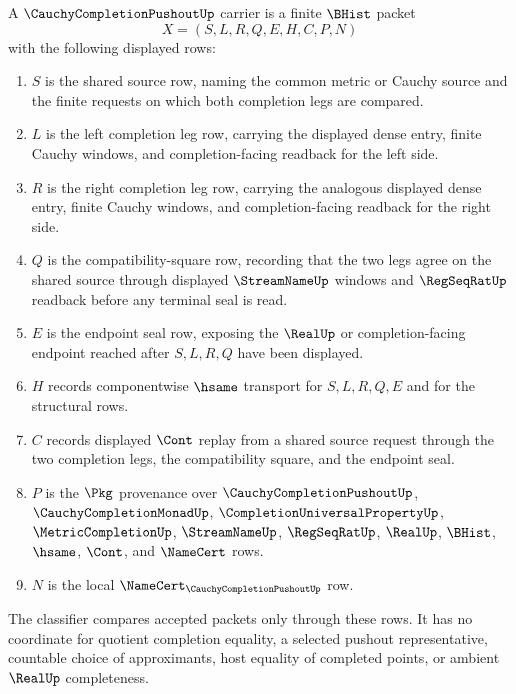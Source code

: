 \begin{definition}
\label{def:cauchy-completion-pushout-carrier}
A $\CauchyCompletionPushoutUp$ carrier is a finite $\BHist$ packet
$$
X=(S,L,R,Q,E,H,C,P,N)
$$
with the following displayed rows:
\begin{enumerate}
\item $S$ is the shared source row, naming the common metric or Cauchy source and the finite requests on which both completion legs are compared.
\item $L$ is the left completion leg row, carrying the displayed dense entry, finite Cauchy windows, and completion-facing readback for the left side.
\item $R$ is the right completion leg row, carrying the analogous displayed dense entry, finite Cauchy windows, and completion-facing readback for the right side.
\item $Q$ is the compatibility-square row, recording that the two legs agree on the shared source through displayed $\StreamNameUp$ windows and $\RegSeqRatUp$ readback before any terminal seal is read.
\item $E$ is the endpoint seal row, exposing the $\RealUp$ or completion-facing endpoint reached after $S,L,R,Q$ have been displayed.
\item $H$ records componentwise $\hsame$ transport for $S,L,R,Q,E$ and for the structural rows.
\item $C$ records displayed $\Cont$ replay from a shared source request through the two completion legs, the compatibility square, and the endpoint seal.
\item $P$ is the $\Pkg$ provenance over $\CauchyCompletionPushoutUp$, $\CauchyCompletionMonadUp$, $\CompletionUniversalPropertyUp$, $\MetricCompletionUp$, $\StreamNameUp$, $\RegSeqRatUp$, $\RealUp$, $\BHist$, $\hsame$, $\Cont$, and $\NameCert$ rows.
\item $N$ is the local $\NameCert_{\CauchyCompletionPushoutUp}$ row.
\end{enumerate}
The classifier compares accepted packets only through these rows. It has no coordinate for quotient completion equality, a selected pushout representative, countable choice of approximants, host equality of completed points, or ambient $\RealUp$ completeness.
\end{definition}

